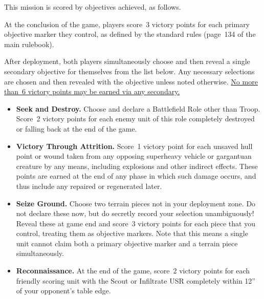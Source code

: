 


This mission is scored by objectives achieved, as follows.

 At the conclusion of the game,
players score~3 victory points for each primary objective marker they
control, as defined by the standard rules (page~134 of the main
rulebook).



After deployment, both players simultaneously choose and then reveal a
single secondary objective for themselves from the list below.  Any
necessary selections are chosen and then revealed with the objective
unless noted otherwise.  \underline{No more than~6 victory points may
  be earned via any secondary.}

\begin{itemize}
\item \textbf{Seek and Destroy.}  Choose and declare a Battlefield
  Role other than Troop.  Score~2 victory points for each enemy unit
  of this role completely destroyed or falling back at the end of the
  game.

\item \textbf{Victory Through Attrition.}  Score~1 victory point for
  each unsaved hull point or wound taken from any opposing superheavy
  vehicle or gargantuan creature by any means, including explosions
  and other indirect effects.  These points are earned at the end of
  any phase in which such damage occurs, and thus include any repaired
  or regenerated later.

\item \textbf{Seize Ground.}  Choose two terrain pieces not in your
  deployment zone.  Do not declare these now, but do secretly record
  your selection unambiguously!  Reveal these at game end and score~3
  victory points for each piece that you control, treating them as
  objective markers.  Note that this means a single unit cannot claim
  both a primary objective marker and a terrain piece simultaneously.

\item \textbf{Reconnaissance.}  At the end of the game, score~2
  victory points for each friendly scoring unit with the Scout or
  Infiltrate USR completely within 12'' of your opponent's table edge.

\end{itemize}


